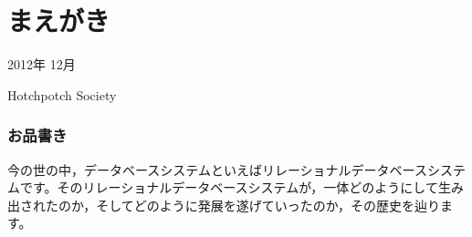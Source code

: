 
\chapter*{まえがき}
\thispagestyle{plainhead}


\begin{flushright}
 2012年 12月

Hotchpotch Society
\end{flushright}

\newpage

\subsection*{お品書き}


今の世の中，データベースシステムといえばリレーショナルデータベースシステムです。そのリレーショナルデータベースシステムが，一体どのようにして生み出されたのか，そしてどのように発展を遂げていったのか，その歴史を辿ります。

\thispagestyle{plainhead}
